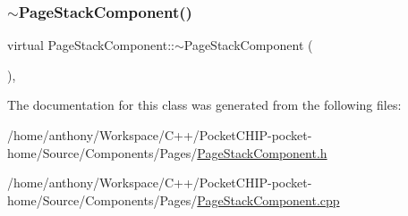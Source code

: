 \mbox{\label{classPageStackComponent_a4921a4cd4b1a7ab8b4f71037b4c7b6d4}} 
\subsubsection{\texorpdfstring{$\sim$\+Page\+Stack\+Component()}{~PageStackComponent()}}
{\footnotesize\ttfamily virtual Page\+Stack\+Component\+::$\sim$\+Page\+Stack\+Component (\begin{DoxyParamCaption}{ }\end{DoxyParamCaption})\hspace{0.3cm}{\ttfamily [inline]}, {\ttfamily [virtual]}}



The documentation for this class was generated from the following files\+:\begin{DoxyCompactItemize}
\item 
/home/anthony/\+Workspace/\+C++/\+Pocket\+C\+H\+I\+P-\/pocket-\/home/\+Source/\+Components/\+Pages/\mbox{\hyperlink{PageStackComponent_8h}{Page\+Stack\+Component.\+h}}\item 
/home/anthony/\+Workspace/\+C++/\+Pocket\+C\+H\+I\+P-\/pocket-\/home/\+Source/\+Components/\+Pages/\mbox{\hyperlink{PageStackComponent_8cpp}{Page\+Stack\+Component.\+cpp}}\end{DoxyCompactItemize}
